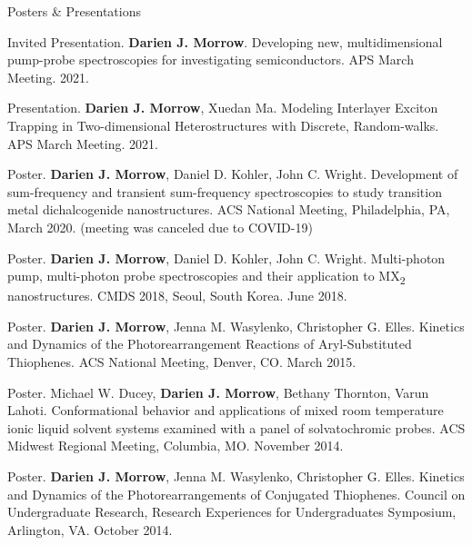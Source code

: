 \documentclass{resume} %
\begin{document}
\begin{rSection}{Posters \& Presentations}
	
	
\begin{etaremune}
	\item Invited Presentation. \textbf{Darien J. Morrow}. Developing new, multidimensional pump-probe spectroscopies for investigating semiconductors. APS March Meeting. 2021.
	
	\item Presentation. \textbf{Darien J. Morrow}, Xuedan Ma. Modeling Interlayer Exciton Trapping in Two-dimensional Heterostructures with Discrete, Random-walks. APS March Meeting. 2021.
	
	\item Poster. \textbf{Darien J. Morrow}, Daniel D. Kohler, John C. Wright. Development of sum-frequency and transient sum-frequency spectroscopies to study transition metal dichalcogenide nanostructures. ACS National Meeting, Philadelphia, PA, March 2020. (meeting was canceled due to COVID-19) 
	
	\item Poster. \textbf{Darien J. Morrow}, Daniel D. Kohler, John C. Wright. Multi-photon pump, multi-photon probe spectroscopies and their application to MX\textsubscript{2} nanostructures. CMDS 2018, Seoul, South Korea. June 2018.

	\item Poster. \textbf{Darien J. Morrow}, Jenna M. Wasylenko, Christopher G. Elles. Kinetics and
	Dynamics of the Photorearrangement Reactions of Aryl-Substituted Thiophenes. ACS National Meeting, Denver, CO. March 2015. 
	
	\item Poster. Michael W. Ducey, \textbf{Darien J. Morrow}, Bethany Thornton, Varun Lahoti. Conformational behavior and applications of mixed room temperature ionic liquid solvent systems examined with a panel of solvatochromic probes. ACS Midwest Regional Meeting, Columbia, MO. November 2014.
	
	\item Poster. \textbf{Darien J. Morrow}, Jenna M. Wasylenko, Christopher G. Elles. Kinetics and Dynamics of the Photorearrangements of Conjugated Thiophenes. Council on Undergraduate Research, Research Experiences for Undergraduates Symposium, Arlington, VA. October 2014.
	
	

\end{etaremune}
\end{rSection}
\end{document}
